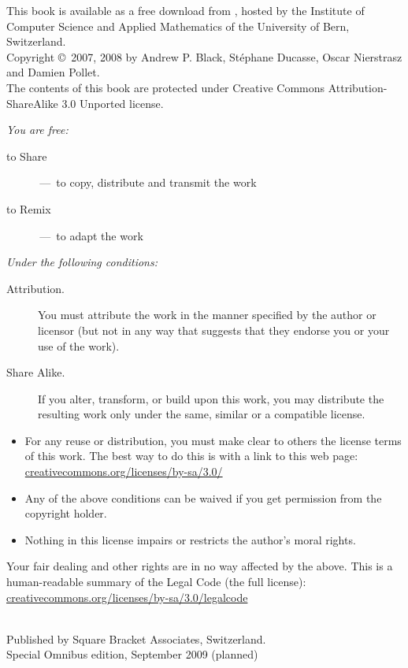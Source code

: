 \documentclass[a4paper,10pt,twoside]{book}
\begin{document}
\begin{footnotesize}
\setlength{\parindent}{0pt}
This book is available as a free download from \sbe, hosted by the
Institute of Computer Science and Applied Mathematics of the
University of Bern, Switzerland.\\[1cm]

Copyright \copyright~2007, 2008 by Andrew P. Black, St\'ephane Ducasse, Oscar Nierstrasz and Damien Pollet.\\[1cm]

The contents of this book are protected under Creative Commons Attribution-ShareAlike 3.0 Unported license.

\emph{You are free:}
\begin{description}
  \item[to Share] \,---\, to copy, distribute and transmit the work
  \item[to Remix] \,---\, to adapt the work
\end{description}
\emph{Under the following conditions:}
\begin{description}
  \item[Attribution.] You must attribute the work in the manner specified by the author or licensor (but not in any way that suggests that they endorse you or your use of the work).
  \item[Share Alike.] If you alter, transform, or build upon this work, you may distribute the resulting work only under the same, similar or a compatible license.
\end{description}
\begin{itemize}
  \item For any reuse or distribution, you must make clear to others the license terms of this work. The best way to do this is with a link to this web page:
  \url{creativecommons.org/licenses/by-sa/3.0/}
  \item Any of the above conditions can be waived if you get permission from the copyright holder.
  \item Nothing in this license impairs or restricts the author's moral rights.
\end{itemize}
\quad
\parbox{\textwidth-2cm-1em}{
	Your fair dealing and other rights are in no way affected by the above.
	This is a human-readable summary of the Legal Code (the full license):\\
	\url{creativecommons.org/licenses/by-sa/3.0/legalcode}}\\[1cm]
Published by Square Bracket Associates, Switzerland. \sba\\
Special Omnibus edition, September 2009 (planned)
\end{footnotesize}
\end{document}
